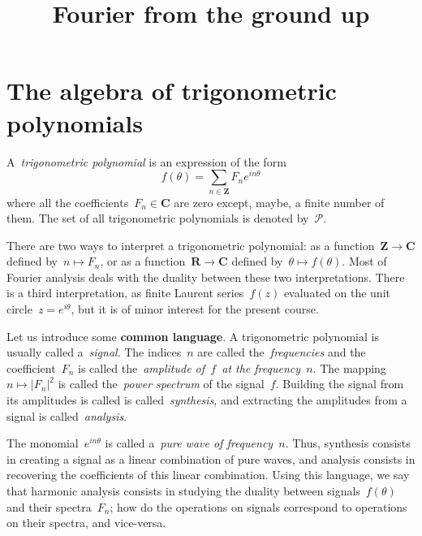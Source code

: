 \title{Fourier from the ground up}


\section{The algebra of trigonometric polynomials}

\newcommand{\Z}{\mathbf{Z}}
\newcommand{\Q}{\mathbf{Q}}
\newcommand{\R}{\mathbf{R}}
\newcommand{\C}{\mathbf{C}}
\newcommand{\T}{\mathbf{T}}
\newcommand{\PP}{\mathcal{P}}
\newcommand{\ud}{\mathrm{d}}
\newcommand{\ds}{\displaystyle}
\newcommand{\DFT}{\mathtt{DFT}}
\newcommand{\IDFT}{\mathtt{IDFT}}


\begin{definition}
A~\emph{trigonometric polynomial} is an expression of the form
$$
	f(\theta)=\sum_{n\in\Z} F_n e^{in\theta}
$$
where all the coefficients~$F_n\in\C$ are zero except, maybe, a finite
number of them.  The set of all trigonometric polynomials is denoted
by~$\PP$.
\end{definition}

There are two ways to interpret a trigonometric polynomial: as a
function~$\Z\to\C$ defined by~$n\mapsto F_n$, or as a function~$\R\to\C$
defined by~$\theta\mapsto f(\theta)$.
Most of Fourier analysis deals with
the duality between these two interpretations.
There is a third interpretation, as finite Laurent series~$f(z)$ evaluated on
the unit circle~$z=e^{i\theta}$, but it is of minor interest for the present
course.

Let us introduce some {\bf common language}.
A trigonometric polynomial is usually called a~\emph{signal}.  The
indices~$n$ are called the~\emph{frequencies} and the coefficient~$F_n$
is called the~\emph{amplitude of~$f$~at the frequency~$n$}.  The
mapping~$n\mapsto\left|F_n\right|^2$ is called the~\emph{power
spectrum} of the signal~$f$.  Building the signal from its amplitudes
is called is called~\emph{synthesis}, and extracting the amplitudes
from a signal is called~\emph{analysis}.

The monomial~$e^{in\theta}$ is called a~\emph{pure wave of frequency~$n$}.
Thus, synthesis consists in creating a signal as a linear combination of pure
waves, and analysis consists in recovering the coefficients of this linear
combination.  Using this language, we say that harmonic analysis consists in
studying the duality between signals~$f(\theta)$ and their spectra~$F_n$; how
do the operations on signals correspond to operations on their spectra, and
vice-versa.




